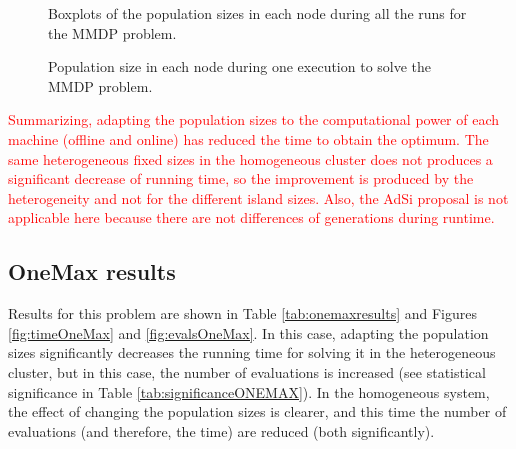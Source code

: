 \documentclass[final,1p,times]{elsarticle}
\begin{document}
\begin{figure}[htb]
\centering
{}
\caption{Boxplots of the population sizes in each node during all the runs for the MMDP problem.}
\label{fig:sizesMMDP}
\end{figure}

\begin{figure}[htb]
\centering
{}
\caption{Population size in each node during one execution to solve the MMDP problem.}
\label{fig:sizesMMDP1ejec}
\end{figure}

\begin{table}
\end{table}


\textcolor{red}{Summarizing, adapting the population sizes to the computational power of each machine (offline and online) has reduced the time to obtain the optimum. The same heterogeneous fixed sizes in the homogeneous cluster does not produces a significant decrease of running time, so the improvement is produced by the heterogeneity and not for the different island sizes. Also, the AdSi proposal is not applicable here because there are not differences of generations during runtime.}


\subsection{OneMax results}

Results for this problem are shown in Table \ref{tab:onemaxresults} and Figures  \ref{fig:timeOneMax} and \ref{fig:evalsOneMax}. In this case, adapting the population sizes significantly decreases  the running time for solving it in the heterogeneous cluster, but in this case, the number of evaluations is increased (see statistical significance in Table \ref{tab:significanceONEMAX}). In the homogeneous system, the effect of changing the population sizes is clearer, and this time the number of evaluations (and therefore, the time) are reduced (both significantly). 
\end{document}
